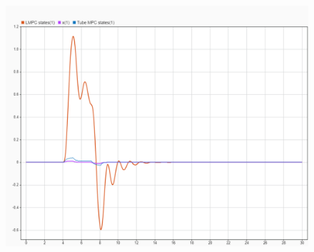 \begin{figure}
	\centering
	\includegraphics[width=1\linewidth]{../img/25}
	\caption{}
	\label{fig:25}
\end{figure}



















